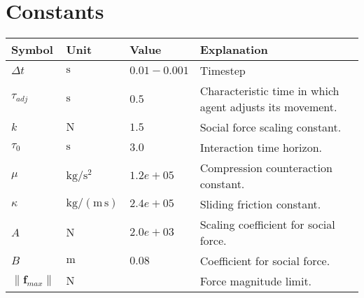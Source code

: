 \section{Constants}

\begin{table}[H]
\begin{tabularx}{1.0\linewidth}{ l l l l }
Symbol         & Unit & Value & Explanation \\
\hline
\hline
$ \Delta t $ & $ \mathrm{s} $ & $ 0.01-0.001 $ & Timestep \\
\hline
\hline
$ \tau_{adj} $ & $ \mathrm{s} $ & $ 0.5 $ & Characteristic time in which agent adjusts its movement. \\
$ k $          & $ \mathrm{N} $ & $ 1.5 $ & Social force scaling constant. \\
$ \tau_{0} $   & $ \mathrm{s} $ & $ 3.0 $ & Interaction time horizon. \\
$ \mu $        & $ \mathrm{kg / s^{2}} $ & $ 1.2e+05 $ & Compression counteraction constant. \\
$ \kappa $     & $ \mathrm{kg / (m\,s)} $ & $ 2.4e+05 $ & Sliding friction constant. \\
$ A $          & $ \mathrm{N} $ & $ 2.0e+03 $ & Scaling coefficient for social force. \\
$ B $          & $ \mathrm{m} $ & $ 0.08 $ & Coefficient for social force. \\
\hline
\hline
$ \left\|\mathbf{f}_{max}\right\| $    & $ \mathrm{N} $ &  & Force magnitude limit. \\
\hline
\end{tabularx} 
\end{table}


